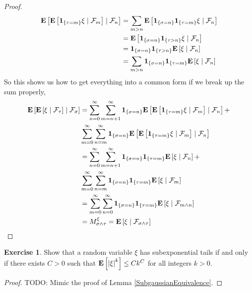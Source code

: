 \documentclass{amsart}
\theoremstyle{remark}
\theoremstyle{definition}
\newtheorem{ex}[thm]{Exercise}
\begin{document}
\begin{proof}
\begin{align*}
\cexpectationlong{\mathcal{F}_n}{\cexpectationlong{\mathcal{F}_m}{\characteristic{
    \lbrace \tau = m \rbrace } \xi}} 
&= \sum_{m>n} \cexpectationlong{\mathcal{F}_n}{\characteristic{\lbrace \sigma = n \rbrace}\characteristic{
    \lbrace \tau = m \rbrace } \xi} \\
&= \cexpectationlong{\mathcal{F}_n}{\characteristic{\lbrace \sigma = n \rbrace}\characteristic{
    \lbrace \tau > n \rbrace } \xi} \\
&=\characteristic{\lbrace \sigma = n \rbrace}\characteristic{
    \lbrace \tau > n \rbrace }  \cexpectationlong{\mathcal{F}_n}{\xi} \\
&= \sum_{m>n} \characteristic{\lbrace \sigma = n \rbrace}\characteristic{
    \lbrace \tau=m \rbrace }  \cexpectationlong{\mathcal{F}_n}{\xi} 
\end{align*}
So this shows us how to get everything into a common form if we break
up the sum properly, 
\begin{align*}
\cexpectationlong{\mathcal{F}_\sigma}{\cexpectationlong{\mathcal{F}_\tau}{\xi}} 
&= \sum_{n=0}^\infty \sum_{m=n+1}^\infty \characteristic{\lbrace \sigma = n \rbrace}
\cexpectationlong{\mathcal{F}_n}{\cexpectationlong{\mathcal{F}_m}{\characteristic{
    \lbrace \tau = m \rbrace } \xi}} + \\
&\sum_{m=0}^\infty \sum_{n=m}^\infty \characteristic{\lbrace \sigma = n \rbrace}
\cexpectationlong{\mathcal{F}_n}{\cexpectationlong{\mathcal{F}_m}{\characteristic{
    \lbrace \tau = m \rbrace } \xi}}  \\
&=\sum_{n=0}^\infty \sum_{m=n+1}^\infty \characteristic{\lbrace \sigma = n \rbrace}\characteristic{
    \lbrace \tau=m \rbrace }  \cexpectationlong{\mathcal{F}_n}{\xi} + \\
&\sum_{m=0}^\infty \sum_{n=m}^\infty \characteristic{\lbrace \sigma = n \rbrace}\characteristic{
    \lbrace \tau=m \rbrace }  \cexpectationlong{\mathcal{F}_m}{\xi}
  \\
&= \sum_{m=0}^\infty \sum_{n=0}^\infty \characteristic{\lbrace \sigma = n \rbrace}\characteristic{
    \lbrace \tau=m \rbrace }  \cexpectationlong{\mathcal{F}_{m\wedge
      n}}{\xi} \\
&= M^\xi_{\sigma \wedge \tau} = \cexpectationlong{\mathcal{F}_{\sigma
    \wedge \tau}}{\xi}
\end{align*}
\end{proof}

\begin{ex}Show that a random variable $\xi$ has subexponential tails
  if and only if there exists $C > 0$ such that
  $\expectation{\abs{\xi}^k} \leq C k^C$ for all integers $k > 0$.
\end{ex}
\begin{proof}
TODO: Mimic the proof of Lemma \ref{SubgaussianEquivalence}.
\end{proof}
\end{document}

